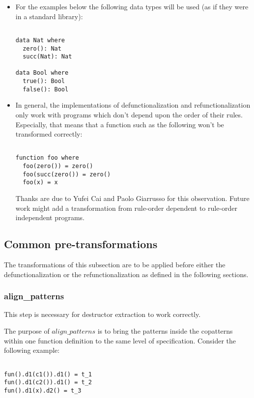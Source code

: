 \documentclass[11pt]{article} %
\begin{document}
\begin{itemize}
\item For the examples below the following data types will be used (as if they were in a standard library):
\begin{lstlisting}

data Nat where
  zero(): Nat
  succ(Nat): Nat

data Bool where
  true(): Bool
  false(): Bool

\end{lstlisting}

\item In general, the implementations of defunctionalization and refunctionalization only work with programs which don't depend upon the order of their rules. Especially, that means that a function such as the following won't be transformed correctly:
\begin{lstlisting}

function foo where
  foo(zero()) = zero()
  foo(succ(zero()) = zero()
  foo(x) = x

\end{lstlisting}

Thanks are due to Yufei Cai and Paolo Giarrusso for this observation. Future work might add a transformation from rule-order dependent to rule-order independent programs.

\end{itemize}

\subsection{Common pre-transformations}

The transformations of this subsection are to be applied before either the defunctionalization or the refunctionalization as defined in the following sections.

\subsubsection{align\_patterns}

This step is necessary for destructor extraction to work correctly.

The purpose of $align\_patterns$ is to bring the patterns inside the copatterns within one function definition to the same level of specification. Consider the following example:

\begin{lstlisting}

fun().d1(c1()).d1() = t_1
fun().d1(c2()).d1() = t_2
fun().d1(x).d2() = t_3

\end{lstlisting}
\end{document}
